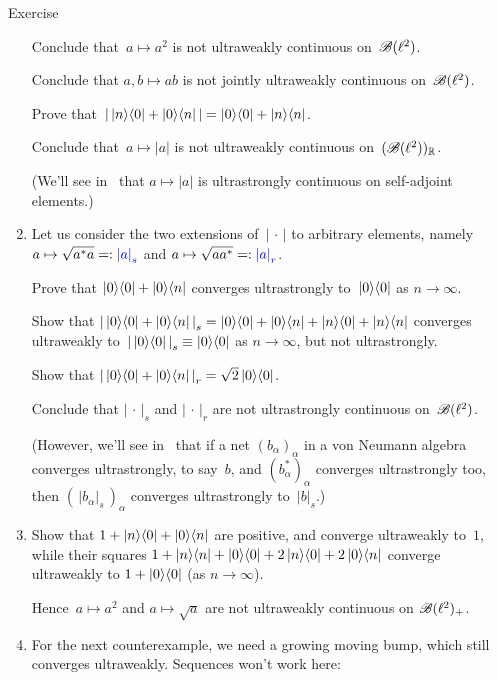\documentclass[a]{subfiles}
\begin{document}
\begin{parsec}
\begin{point}{Exercise}
\begin{enumerate}
Conclude that~$a\mapsto a^2$ is not ultraweakly continuous on~$\mathscr{B}(\ell^2)$.

Conclude that $a,b\mapsto ab$ is not jointly ultraweakly continuous
on~$\mathscr{B}(\ell^2)$.

Prove that~$\left|\, \left|n\right>\!\left<0\right|+\left|0\right>\!\left<n\right|\,\right|
= \left|0\right>\!\left<0\right|+\left|n\right>\!\left<n\right|$.

Conclude that~$a\mapsto \left|a\right|$
is not ultraweakly continuous on~$(\mathscr{B}(\ell^2))_{\mathbb{R}}$.

(We'll see in~ that $a\mapsto \left|a\right|$
is ultrastrongly continuous on self-adjoint elements.)

\item
Let us consider the two extensions of~$\left|\,\cdot\,\right|$
to arbitrary elements, namely
$a\mapsto \sqrt{a^*a}=:\Define{\left|a\right|_s}$ and 
$a\mapsto \sqrt{aa^*}=:\Define{\left|a\right|_r}$.

Prove that $\left|0\right>\!\left<0\right| + \left|0\right>\!\left<n\right|$
converges ultrastrongly to~$\left|0\right>\!\left<0\right|$ as $n\to \infty$.

Show that $\left|\,\left|0\right>\!\left<0\right|+\left|0\right>\!\left<n\right|\,\right|_s
= \left|0\right>\!\left<0\right|
+\left|0\right>\!\left<n\right|
+\left|n\right>\!\left<0\right|
+\left|n\right>\!\left<n\right|$
converges ultraweakly to~$\left|\,\left|0\right>\!\left<0\right|\,\right|_s
\equiv \left|0\right>\!\left<0\right|$
as $n\to \infty$,
but not ultrastrongly.

Show that $\left|\,\left|0\right>\!\left<0\right|+\left|0\right>\!\left<n\right|\,\right|_r
= \sqrt{2} \left|0\right>\!\left<0\right|$.

Conclude that $\left|\,\cdot\,\right|_s$
and $\left|\,\cdot\,\right|_r$
are not ultrastrongly continuous on~$\mathscr{B}(\ell^2)$.

(However, we'll see in~\TODO{}
that if a net $(b_\alpha)_\alpha$
in a von Neumann algebra
converges ultrastrongly, to say~$b$,
and $(b_\alpha^*)_\alpha$
converges ultrastrongly too,
then $(\,\left|b_\alpha\right|_s\,)_\alpha$
converges ultrastrongly to~$\left|b\right|_s$.)

\item
Show that $1+\left|n\right>\!\left<0\right|+\left|0\right>\!\left<n\right|$
are positive,
and 
converge ultraweakly to~$1$,
while their squares
$1+\left|n\right>\!\left<n\right|+\left|0\right>\!\left<0\right|+2\left|n\right>\!\left<0\right|+2\left|0\right>\!\left<n\right|$
converge ultraweakly to $1+\left|0\right>\!\left<0\right|$
(as $n\to\infty$).

Hence~$a\mapsto a^2$
and $a\mapsto \sqrt{a}$
are not ultraweakly continuous on $\mathscr{B}(\ell^2)_{+}$.

\item
For the next counterexample,
we need a growing moving bump,
which still converges ultraweakly.
Sequences won't work here:


\end{enumerate}
\end{point}
\end{parsec}
\end{document}
